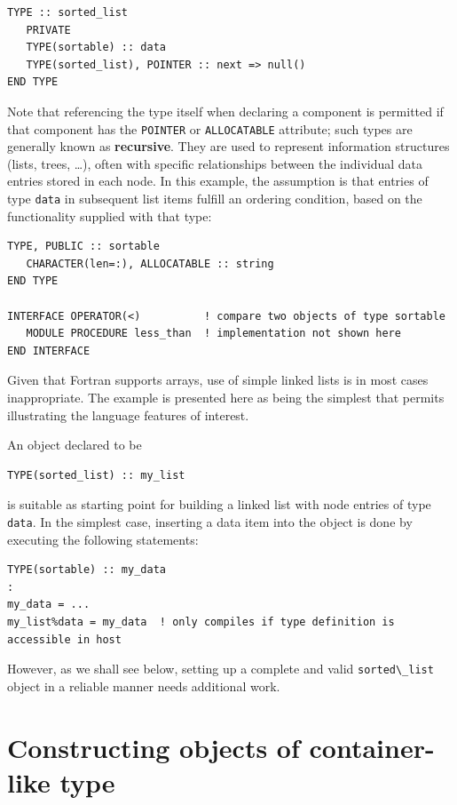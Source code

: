 \documentclass[
  paper=a4,
  ,captions=tableheading
]{scrartcl}
\newcommand{\passthrough}[1]{#1}
\begin{document}
\begin{lstlisting}
TYPE :: sorted_list
   PRIVATE
   TYPE(sortable) :: data
   TYPE(sorted_list), POINTER :: next => null()
END TYPE
\end{lstlisting}

Note that referencing the type itself when declaring a component is
permitted if that component has the \passthrough{\lstinline!POINTER!} or
\passthrough{\lstinline!ALLOCATABLE!} attribute; such types are
generally known as \textbf{recursive}. They are used to represent
information structures (lists, trees, \ldots), often with specific
relationships between the individual data entries stored in each node.
In this example, the assumption is that entries of type
\passthrough{\lstinline!data!} in subsequent list items fulfill an
ordering condition, based on the functionality supplied with that type:

\begin{lstlisting}
TYPE, PUBLIC :: sortable
   CHARACTER(len=:), ALLOCATABLE :: string
END TYPE

INTERFACE OPERATOR(<)          ! compare two objects of type sortable
   MODULE PROCEDURE less_than  ! implementation not shown here
END INTERFACE
\end{lstlisting}

Given that Fortran supports arrays, use of simple linked lists is in
most cases inappropriate. The example is presented here as being the
simplest that permits illustrating the language features of interest.

An object declared to be

\begin{lstlisting}
TYPE(sorted_list) :: my_list
\end{lstlisting}

is suitable as starting point for building a linked list with node
entries of type \passthrough{\lstinline!data!}. In the simplest case,
inserting a data item into the object is done by executing the following
statements:

\begin{lstlisting}
TYPE(sortable) :: my_data
:
my_data = ...
my_list%data = my_data  ! only compiles if type definition is accessible in host
\end{lstlisting}

However, as we shall see below, setting up a complete and valid
\passthrough{\lstinline!sorted\_list!} object in a reliable manner needs
additional work.

\section{Constructing objects of container-like
type}\label{constructing-objects-of-container-like-type}
\end{document}
